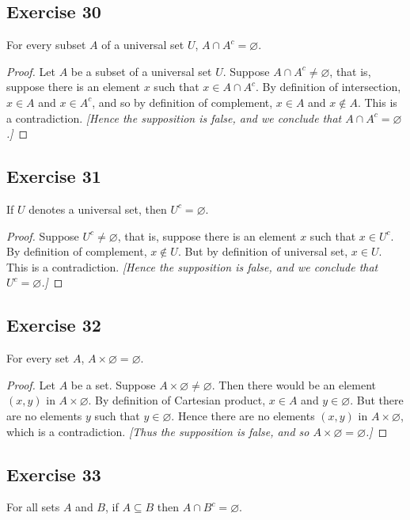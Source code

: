 \documentclass[14pt]{extarticle}
\newcommand{\es}{\varnothing}
\begin{document}
\subsection{Exercise 30}
For every subset $A$ of a universal set $U$, \(A \cap A^c = \es\).

\begin{proof}
Let $A$ be a subset of a universal set $U$. Suppose \(A \cap A^c \neq \es\), that is, suppose there is an element 
$x$ such that \(x \in A \cap A^c\). By definition of intersection, $x \in A$ and $x \in A^c$, and so by 
definition of complement, $x \in A$ and $x \notin A$. This is a contradiction. {\it [Hence the supposition is false, 
and we conclude that \(A \cap A^c = \es\).]}
\end{proof}

\subsection{Exercise 31}
If $U$ denotes a universal set, then \(U^c = \es\).

\begin{proof}
Suppose \(U^c \neq \es\), that is, suppose there is an element $x$ such that \(x \in U^c\). By definition of 
complement, $x \notin U$. But by definition of universal set, $x \in U$. This is a contradiction. {\it [Hence the 
supposition is false, and we conclude that \(U^c = \es\).]}
\end{proof}

\subsection{Exercise 32}
For every set $A$, \(A \times \es = \es\).

\begin{proof}
Let $A$ be a set. Suppose \(A \times \es \neq \es\). Then there would be an element $(x, y)$ in \(A \times \es\). By 
definition of Cartesian product, \(x \in A\) and \(y \in \es\). But there are no elements $y$ such that 
\(y \in \es\). Hence there are no elements \((x, y)\) in \(A \times \es\), which is a contradiction. {\it [Thus the 
supposition is false, and so \(A \times \es = \es\).]}
\end{proof}

\subsection{Exercise 33}
For all sets $A$ and $B$, if \(A \subseteq B\) then \(A \cap B^c = \es\).
\end{document}
